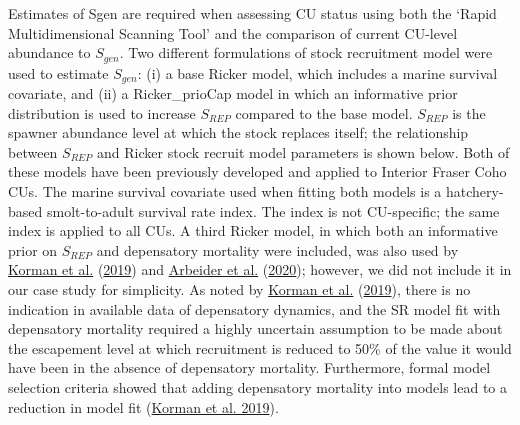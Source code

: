 \documentclass[11pt]{book}
\begin{document}
Estimates of Sgen are required when assessing CU status using both the `Rapid Multidimensional Scanning Tool' and the comparison of current CU-level abundance to \(S_{gen}\). Two different formulations of stock recruitment model were used to estimate \(S_{gen}\): (i) a base Ricker model, which includes a marine survival covariate, and (ii) a Ricker\_prioCap model in which an informative prior distribution is used to increase \(S_{REP}\) compared to the base model. \(S_{REP}\) is the spawner abundance level at which the stock replaces itself; the relationship between \(S_{REP}\) and Ricker stock recruit model parameters is shown below. Both of these models have been previously developed and applied to Interior Fraser Coho CUs. The marine survival covariate used when fitting both models is a hatchery-based smolt-to-adult survival rate index. The index is not CU-specific; the same index is applied to all CUs. A third Ricker model, in which both an informative prior on \(S_{REP}\) and depensatory mortality were included, was also used by \protect\hyperlink{ref-kormanEvaluationFrameworkAssessing2019}{Korman et al.} (\protect\hyperlink{ref-kormanEvaluationFrameworkAssessing2019}{2019}) and \protect\hyperlink{ref-arbeiderInteriorFraserCoho2020}{Arbeider et al.} (\protect\hyperlink{ref-arbeiderInteriorFraserCoho2020}{2020}); however, we did not include it in our case study for simplicity. As noted by \protect\hyperlink{ref-kormanEvaluationFrameworkAssessing2019}{Korman et al.} (\protect\hyperlink{ref-kormanEvaluationFrameworkAssessing2019}{2019}), there is no indication in available data of depensatory dynamics, and the SR model fit with depensatory mortality required a highly uncertain assumption to be made about the escapement level at which recruitment is reduced to 50\% of the value it would have been in the absence of depensatory mortality. Furthermore, formal model selection criteria showed that adding depensatory mortality into models lead to a reduction in model fit (\protect\hyperlink{ref-kormanEvaluationFrameworkAssessing2019}{Korman et al. 2019}).
\end{document}
